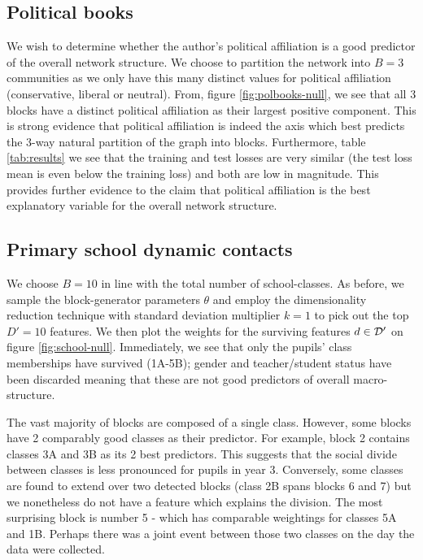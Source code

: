 \subsection{Political books}

We wish to determine whether the author's political affiliation is a good predictor of the overall network structure. We choose to partition the network into $B=3$ communities as we only have this many distinct values for political affiliation (conservative, liberal or neutral). From, figure \ref{fig:polbooks-null}, we see that all 3 blocks have a distinct political affiliation as their largest positive component. This is strong evidence that political affiliation is indeed the axis which best predicts the 3-way natural partition of the graph into blocks. Furthermore, table \ref{tab:results} we see that the training and test losses are very similar (the test loss mean is even below the training loss) and both are low in magnitude. This provides further evidence to the claim that political affiliation is the best explanatory variable for the overall network structure.

\subsection{Primary school dynamic contacts}

We choose $B=10$ in line with the total number of school-classes. As before, we sample the block-generator parameters $\theta$ and employ the dimensionality reduction technique with standard deviation multiplier $k=1$ to pick out the top $D'=10$ features. We then plot the weights for the surviving features $d \in \mathcal{D}'$ on figure \ref{fig:school-null}. Immediately, we see that only the pupils' class memberships have survived (1A-5B); gender and teacher/student status have been discarded meaning that these are not good predictors of overall macro-structure.

The vast majority of blocks are composed of a single class. However, some blocks have 2 comparably good classes as their predictor. For example, block 2 contains classes 3A and 3B as its 2 best predictors. This suggests that the social divide between classes is less pronounced for pupils in year 3. Conversely, some classes are found to extend over two detected blocks (class 2B spans blocks 6 and 7) but we nonetheless do not have a feature which explains the division. The most surprising block is number 5 - which has comparable weightings for classes 5A and 1B. Perhaps there was a joint event between those two classes on the day the data were collected.

